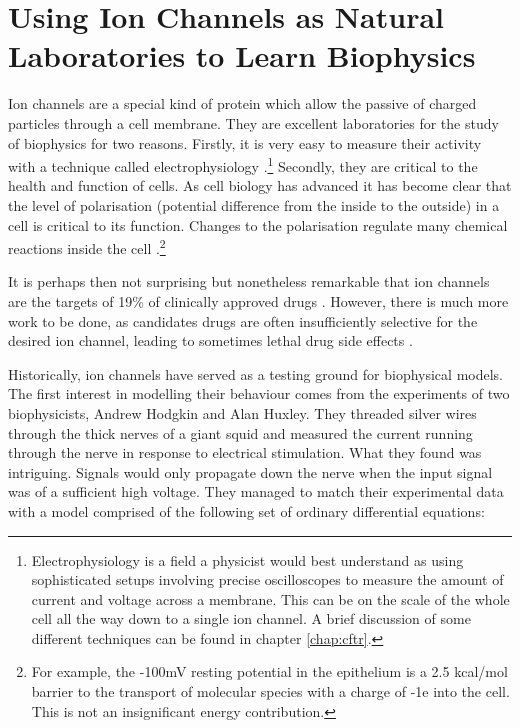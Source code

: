 \section{Using Ion Channels as Natural Laboratories to Learn Biophysics}

Ion channels are a special kind of protein which allow the passive of charged particles through a cell membrane. They are excellent laboratories for the study of biophysics for two reasons. Firstly, it is very easy to measure their activity with a technique called electrophysiology \cite{hille2001}.\footnote{Electrophysiology is a field a physicist would best understand as using sophisticated setups involving precise oscilloscopes to measure the amount of current and voltage across a membrane. This can be on the scale of the whole cell all the way down to a single ion channel. A brief discussion of some different techniques can be found in chapter \ref{chap:cftr}.} Secondly, they are critical to the health and function of cells. As cell biology has advanced it has become clear that the level of polarisation (potential difference from the inside to the outside) in a cell is critical to its function. Changes to the polarisation regulate many chemical reactions inside the cell \cite{catterall2011, muthuswamy2012, levin2014, levin2014a}.\footnote{For example, the -100mV resting potential in the epithelium is a 2.5 kcal/mol barrier to the transport of molecular species with a charge of -1e into the cell. This is not an insignificant energy contribution.}

It is perhaps then not surprising but nonetheless remarkable that ion channels are the targets of 19\% of clinically approved drugs \cite{santos2017}. However, there is much more work to be done, as candidates drugs are often insufficiently selective for the desired ion channel, leading to sometimes lethal drug side effects \cite{stansfeld2006, kaczorowski2008, waszkielewicz2013}.

Historically, ion channels have served as a testing ground for biophysical models. The first interest in modelling their behaviour comes from the experiments of two biophysicists, Andrew Hodgkin and Alan Huxley. They threaded silver wires through the thick nerves of a giant squid and measured the current running through the nerve in response to electrical stimulation. What they found was intriguing. Signals would only propagate down the nerve when the input signal was of a sufficient high voltage. They managed to match their experimental data with a model comprised of the following set of ordinary differential equations:

